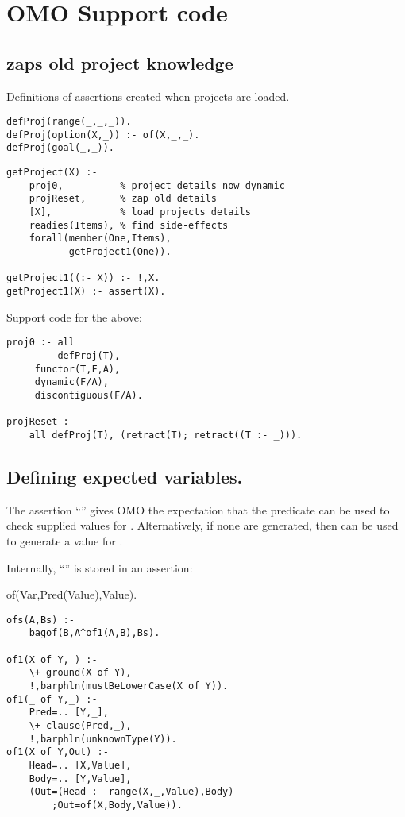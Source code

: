 \section{ OMO Support code}
\subsection{  zaps old project knowledge}
Definitions of assertions created when projects
are loaded.
\begin{Verbatim}
defProj(range(_,_,_)).
defProj(option(X,_)) :- of(X,_,_).
defProj(goal(_,_)).
\end{Verbatim}
\begin{Verbatim}
getProject(X) :-
	proj0,          % project details now dynamic
	projReset,      % zap old details
	[X],            % load projects details
	readies(Items), % find side-effects
	forall(member(One,Items),
	       getProject1(One)).

getProject1((:- X)) :- !,X.
getProject1(X) :- assert(X).
\end{Verbatim}
Support code for the above:
\begin{Verbatim}
proj0 :- all
         defProj(T),
	 functor(T,F,A),
	 dynamic(F/A),
	 discontiguous(F/A).

projReset :-
	all defProj(T), (retract(T); retract((T :- _))).
\end{Verbatim}
\subsection{Defining expected variables.}

The assertion ``''
gives OMO the expectation that
the predicate 
can be used
to check supplied values for .
Alternatively, if none are generated,
then  can be used to generate
a value for .

Internally,  ``'' is stored
in an  assertion:
\begin{LISTING}
of(Var,Pred(Value),Value).
\end{LISTING}

\begin{Verbatim}
ofs(A,Bs) :-
	bagof(B,A^of1(A,B),Bs).

of1(X of Y,_) :-
	\+ ground(X of Y),
	!,barphln(mustBeLowerCase(X of Y)).
of1(_ of Y,_) :-
	Pred=.. [Y,_],
	\+ clause(Pred,_),
	!,barphln(unknownType(Y)).
of1(X of Y,Out) :-
	Head=.. [X,Value],
	Body=.. [Y,Value],
	(Out=(Head :- range(X,_,Value),Body)
        ;Out=of(X,Body,Value)).
\end{Verbatim}
